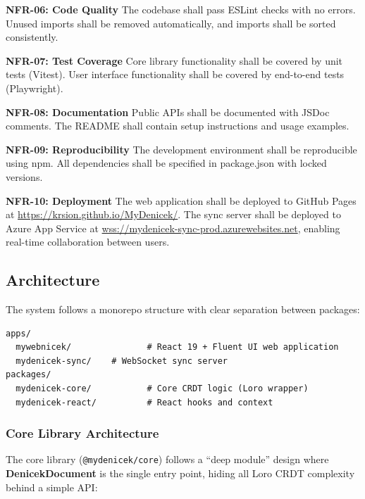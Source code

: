 \documentclass{article}
\begin{document}
\textbf{NFR-06: Code Quality} The codebase shall pass ESLint checks with no errors. Unused imports shall be removed automatically, and imports shall be sorted consistently.

\textbf{NFR-07: Test Coverage} Core library functionality shall be covered by unit tests (Vitest). User interface functionality shall be covered by end-to-end tests (Playwright).

\textbf{NFR-08: Documentation} Public APIs shall be documented with JSDoc comments. The README shall contain setup instructions and usage examples.

\textbf{NFR-09: Reproducibility} The development environment shall be reproducible using npm. All dependencies shall be specified in package.json with locked versions.

\textbf{NFR-10: Deployment} The web application shall be deployed to GitHub Pages at \url{https://krsion.github.io/MyDenicek/}. The sync server shall be deployed to Azure App Service at \url{wss://mydenicek-sync-prod.azurewebsites.net}, enabling real-time collaboration between users.


\subsection{Architecture}

The system follows a monorepo structure with clear separation between packages:

\begin{verbatim}
apps/
  mywebnicek/               # React 19 + Fluent UI web application
  mydenicek-sync/    # WebSocket sync server
packages/
  mydenicek-core/           # Core CRDT logic (Loro wrapper)
  mydenicek-react/          # React hooks and context
\end{verbatim}

\subsubsection{Core Library Architecture}

The core library (\texttt{@mydenicek/core}) follows a ``deep module'' design where \textbf{DenicekDocument} is the single entry point, hiding all Loro CRDT complexity behind a simple API:
\end{document}
